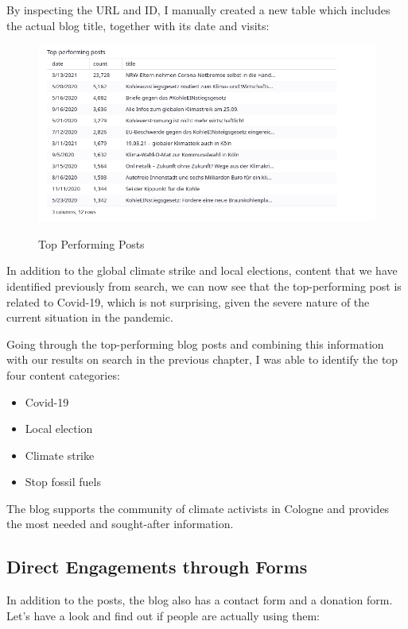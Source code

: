 By inspecting the URL and ID, I manually created a new table which includes the actual blog title, together with its date and visits:

\begin{figure}[H]
\centering
\caption {Top Performing Posts}
\includegraphics[width=\linewidth]{images/figure13.png}
\label{fig:manualReview}
\end{figure}

In addition to the global climate strike and local elections, content that we have identified previously from search, we can now see that the top-performing post is related to Covid-19, which is not surprising, given the severe nature of the current situation in the pandemic.

Going through the top-performing blog posts and combining this information with our results on search in the previous chapter, I was able to identify the top four content categories:

\begin{itemize}
 \item Covid-19
 \item Local election
 \item Climate strike
 \item Stop fossil fuels
\end{itemize}

The blog supports the community of climate activists in Cologne and provides the most needed and sought-after information.

\subsection{Direct Engagements through Forms}

In addition to the posts, the blog also has a contact form and a donation form. Let's have a look and find out if people are actually using them:

